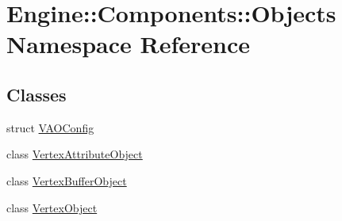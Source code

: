 \hypertarget{namespaceEngine_1_1Components_1_1Objects}{}\section{Engine\+:\+:Components\+:\+:Objects Namespace Reference}
\label{namespaceEngine_1_1Components_1_1Objects}
\subsection*{Classes}
\begin{DoxyCompactItemize}
\item 
struct \mbox{\hyperlink{structEngine_1_1Components_1_1Objects_1_1VAOConfig}{V\+A\+O\+Config}}
\item 
class \mbox{\hyperlink{classEngine_1_1Components_1_1Objects_1_1VertexAttributeObject}{Vertex\+Attribute\+Object}}
\item 
class \mbox{\hyperlink{classEngine_1_1Components_1_1Objects_1_1VertexBufferObject}{Vertex\+Buffer\+Object}}
\item 
class \mbox{\hyperlink{classEngine_1_1Components_1_1Objects_1_1VertexObject}{Vertex\+Object}}
\end{DoxyCompactItemize}
